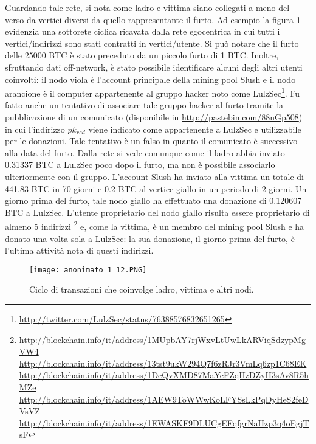 Guardando tale rete, si nota come ladro e vittima siano collegati a meno del verso da vertici diversi da quello rappresentante il furto. Ad esempio la figura \ref{anonimato_1_12} evidenzia una sottorete ciclica ricavata dalla rete egocentrica in cui tutti i vertici/indirizzi sono stati contratti in vertici/utente.
Si può notare che il furto delle 25000 BTC è stato preceduto da un piccolo furto di 1 BTC. Inoltre, sfruttando dati off-network, è stato possibile identificare alcuni degli altri utenti coinvolti: il nodo viola è l'account principale della mining pool Slush e il nodo arancione è il computer appartenente al gruppo hacker noto come LulzSec\footnote{\url{http://twitter.com/LulzSec/status/76388576832651265}}. Fu fatto anche un tentativo di associare tale gruppo hacker al furto tramite la pubblicazione di un comunicato (disponibile in \url{http://pastebin.com/88nGp508}) in cui l'indirizzo $pk_{red}$ viene indicato come appartenente a LulzSec e utilizzabile per le donazioni. Tale tentativo è un falso in quanto il comunicato è successivo alla data del furto.
Dalla rete si vede comunque come il ladro abbia inviato 0.31337 BTC a LulzSec poco dopo il furto, ma non è possibile associarlo ulteriormente con il gruppo.
L'account Slush ha inviato alla vittima un totale di 441.83 BTC in 70 giorni e 0.2 BTC al vertice giallo in un periodo di 2 giorni. Un giorno prima del furto, tale nodo giallo ha effettuato una donazione di 0.120607 BTC a LulzSec. L'utente proprietario del nodo giallo risulta essere proprietario di almeno 5 indirizzi \footnote{\url{http://blockchain.info/it/address/1MUpbAY7rjWxvLtUwLkARViqSdzypMgVW4}\\ \url{http://blockchain.info/it/address/13tst9ukW294Q7f6zRJr3VmLq6zp1C68EK}\\ \url{http://blockchain.info/it/address/1DcQvXMD87MaYcFZqHzDZyH3sAv8R5hMZe}\\ \url{http://blockchain.info/it/address/1AEW9ToWWwKoLFYSsLkPqDyHeS2feDVsVZ}\\ \url{http://blockchain.info/it/address/1EWASKF9DLUCgEFqfgrNaHzp3q4oEgjTsF}} e, come la vittima, è un membro del mining pool Slush e ha donato una volta sola a LulzSec: la sua donazione, il giorno prima del furto, è l'ultima attività nota di questi indirizzi.

\begin{figure}[htbp]
\centering
\texttt{[image: anonimato\_1\_12.PNG]}
\caption[Transazioni tra ladro e vittima]{Ciclo di transazioni che coinvolge ladro, vittima e altri nodi.\label{anonimato_1_12}}
\end{figure}

